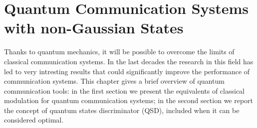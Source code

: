 
\chapter[Quantum Communication Systems]{Quantum Communication Systems with non-Gaussian States}
    Thanks to quantum mechanics, it will be possible to overcome the limits of classical 
    communication systems. In the last decades the research in this field has led to very 
    intresting results that could significantly improve the performance of communication systems. 
    This chapter gives a brief overview of quantum communication tools: in the first section we
    present the equivalents of classical modulation for quantum communication systems; in the second 
    section we report the concept of quantum states discriminator (QSD), included when it can be 
    considered optimal.

    
    